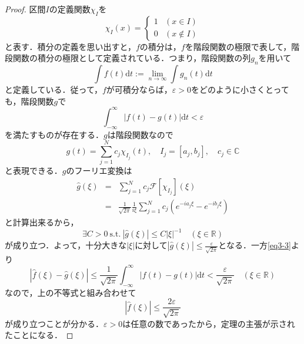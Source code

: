 \documentclass[a4j]{jsbook}
\numberwithin{theorem}{chapter}  %
\begin{document}
\begin{proof}
区間\(I\)の定義関数\(\chi_I\)を
\begin{equation*}
    \chi_I(x)=
    \begin{cases}
    1 & (x\in I) \\
    0 & (x\notin I)
    \end{cases}
\end{equation*}
と表す．積分の定義を思い出すと，\(f\)の積分は，\(f\)を階段関数の極限で表して，階段関数の積分の極限として定義されている．つまり，階段関数の列\(g_n\)を用いて
\begin{equation*}
    \int f(t)\mathrm{d}t:=\lim_{n\to\infty}\int g_n(t)\mathrm{d}t
\end{equation*}
と定義している．従って，\(f\)が可積分ならば，\(\varepsilon>0\)をどのように小さくとっても，階段関数\(g\)で
\begin{equation}
    \int_{-\infty}^\infty|f(t)-g(t)|\mathrm{d}t<\varepsilon \label{eq3-3}
\end{equation}
を満たすものが存在する．\(g\)は階段関数なので
\begin{equation*}
    g(t)=\sum_{j=1}^N c_j\chi_{I_j}(t),\quad I_j=[a_j, b_j],\quad c_j\in\mathbb{C}
\end{equation*}
と表現できる．\(g\)のフーリエ変換は
\begin{eqnarray*}
\hat{g}(\xi)&=&\sum_{j=1}^N c_j\mathcal{F}[\chi_{I_j}](\xi) \\
&=&\frac{1}{\sqrt{2\pi}}\frac{1}{i\xi}\sum_{j=1}^N c_j\left(e^{-ia_j\xi}-e^{-ib_j\xi}\right)
\end{eqnarray*}
と計算出来るから，
\begin{equation*}
    \exists C>0\ \mathrm{s.t.}\ \left|\hat{g}(\xi)\right|\leq C|\xi|^{-1}\quad(\xi\in\mathbb{R})
\end{equation*}
が成り立つ．よって，十分大きな\(|\xi|\)に対して\(\displaystyle\left|\hat{g}(\xi)\right|\leq\frac{\varepsilon}{\sqrt{2\pi}}\)となる．一方\eqref{eq3-3}より
\begin{equation*}
    \left|\hat{f}(\xi)-\hat{g}(\xi)\right|\leq\frac{1}{\sqrt{2\pi}}\int_{-\infty}^\infty|f(t)-g(t)|\mathrm{d}t<\frac{\varepsilon}{\sqrt{2\pi}}\quad(\xi\in\mathbb{R})
\end{equation*}
なので，上の不等式と組み合わせて
\begin{equation*}
    \left|\hat{f}(\xi)\right|\leq\frac{2\varepsilon}{\sqrt{2\pi}}
\end{equation*}
が成り立つことが分かる．\(\varepsilon>0\)は任意の数であったから，定理の主張が示されたことになる．
\end{proof}
\end{document}
